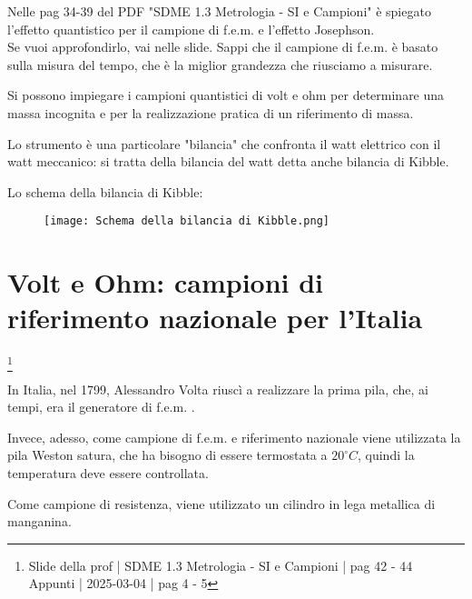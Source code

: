 \begin{tcolorbox}
    Nelle pag 34-39 del PDF "SDME 1.3 Metrologia - SI e Campioni" è spiegato l'effetto quantistico per il campione di f.e.m. e l'effetto Josephson. \\ 
    Se vuoi approfondirlo, vai nelle slide. Sappi che il campione di f.e.m. è basato sulla misura del tempo, che è la miglior grandezza che riusciamo a misurare.   
\end{tcolorbox}

Si possono impiegare i campioni quantistici di volt e ohm per determinare una massa incognita e 
per la realizzazione pratica di un riferimento di massa. \newline 

Lo strumento è una particolare "bilancia" che confronta il watt elettrico con il watt meccanico: 
si tratta della bilancia del watt detta anche bilancia di Kibble. \newline 

Lo schema della bilancia di Kibble: 

\begin{figure}[h]
    \centering
    \texttt{[image: Schema della bilancia di Kibble.png]}
\end{figure}


\newpage 

\section{Volt e Ohm: campioni di riferimento nazionale per l'Italia}
\footnote{Slide della prof | SDME 1.3 Metrologia - SI e Campioni | pag 42 - 44 \\  
Appunti | 2025-03-04 | pag 4 - 5}

In Italia, nel 1799, Alessandro Volta riuscì a realizzare la prima pila, 
che, ai tempi, era il generatore di f.e.m. .\newline

Invece, adesso, come campione di f.e.m. e riferimento nazionale 
viene utilizzata la pila Weston satura, che ha bisogno di essere termostata a $20 ^{\circ} C$, 
quindi la temperatura deve essere controllata. \newline 

Come campione di resistenza, viene utilizzato un cilindro in lega metallica di manganina. \newline 

\newpage 
